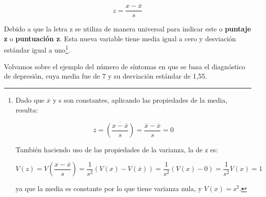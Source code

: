 \documentclass[]{book}
\let\rmarkdownfootnote\footnote%
\def\footnote{\protect\rmarkdownfootnote}
\begin{document}
\[z = \frac{x - \overline{x}}{s}\]

Debido a que la letra z se utiliza de manera universal para indicar este o \textbf{puntaje z} o \textbf{puntuación z}. Esta nueva variable tiene media igual a cero y desviación estándar igual a uno\footnote{Dado que \(\overline{x}\) y s son constantes, aplicando las
  propiedades de la media, resulta:

  \[\overline{z} = \overline{\left( \frac{x - \overline{x}}{s} \right)} = \frac{\overline{x} - \overline{x}}{s} = 0\]

  También haciendo uso de las propiedades de la varianza, la de z es:

  \[V\left( z \right) = V\left( \frac{x - \overline{x}}{s} \right) = \frac{1}{s^{2}}\left( V\left( x \right) - V\left( \overline{x} \right) \right) = \frac{1}{s^{2}}\left( V\left( x \right) - 0 \right) = \frac{1}{s^{2}}V\left( x \right) = 1\]

  ya que la media es constante por lo que tiene varianza nula, y \(V\left( x \right) = s^{2}\).}.

Volvamos sobre el ejemplo del número de síntomas en que se basa el
diagnóstico de depresión, cuya media fue de 7 y su desviación estándar
de 1,55.
\end{document}
